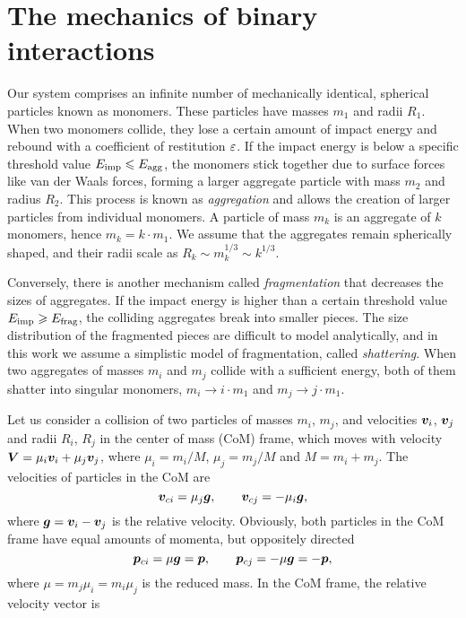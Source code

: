 \documentclass[aps,prl,preprint,groupedaddress,10pt]{revtex4-2}
\begin{document}
\section{The mechanics of binary interactions}
Our system comprises an infinite number of mechanically identical, spherical particles 
known as monomers. These particles have masses $m_1$ and radii $R_1$. When two 
monomers collide, they lose a certain amount of impact energy and rebound with a 
coefficient of restitution $\varepsilon$. If the impact energy is below a specific threshold 
value $E_{\mathrm{imp}}\leqslant E_{\mathrm{agg}}$, the monomers stick together due to surface 
forces like van der Waals forces, forming a larger aggregate particle with mass $m_2$ 
and radius $R_2$. This process is known as \emph{aggregation} and allows the creation 
of larger particles from individual monomers. A particle of mass $m_k$ is an aggregate
of $k$ monomers, hence $m_k=k\cdot m_1$. We assume that the aggregates remain 
spherically shaped, and their radii scale as $R_k\sim m_k^{1/3}\sim k^{1/3}$.

Conversely, there is another mechanism called \emph{fragmentation} that decreases the 
sizes of aggregates. If the impact energy is higher than a certain threshold value 
$E_{\mathrm{imp}}\geqslant E_{\mathrm{frag}}$, the colliding aggregates break into smaller pieces.
The size distribution of the fragmented pieces are difficult to model analytically, and
in this work we assume a simplistic model of fragmentation, called \emph{shattering}.
When two aggregates of masses $m_i$ and $m_j$ collide with a sufficient energy, both 
of them shatter into singular monomers, $m_i\to i\cdot m_1$ and $m_j\to j\cdot m_1$.

Let us consider a collision of two particles of masses $m_i$, $m_j$, and velocities 
$\vb*{v}_i$, $\vb*{v}_j$ and radii $R_i$, $R_j$ in the center of mass (CoM) frame, which moves 
with velocity $\vb*{V}=\mu_i\vb*{v}_i+\mu_j\vb*{v}_j$, where $\mu_i=m_i/M$, $\mu_j=m_j/M$ and 
$M=m_i+m_j$. The velocities of particles in the CoM are 
\begin{equation}
    \vb*{v}_{ci}=\mu_j\vb*{g},\qquad\vb*{v}_{cj}=-\mu_i\vb*{g},
\end{equation}
where $\vb*{g}=\vb*{v}_i-\vb*{v}_j$ is the relative velocity. Obviously, both particles in the CoM
frame have equal amounts of momenta, but oppositely directed
\begin{equation}
    \vb*{p}_{ci}=\mu\vb*{g}=\vb*{p},\qquad\vb*{p}_{cj}=-\mu\vb*{g}=-\vb*{p},
\end{equation}
where $\mu=m_j\mu_i=m_i\mu_j$ is the reduced mass. In the CoM frame, the relative velocity 
vector is 
\end{document}
